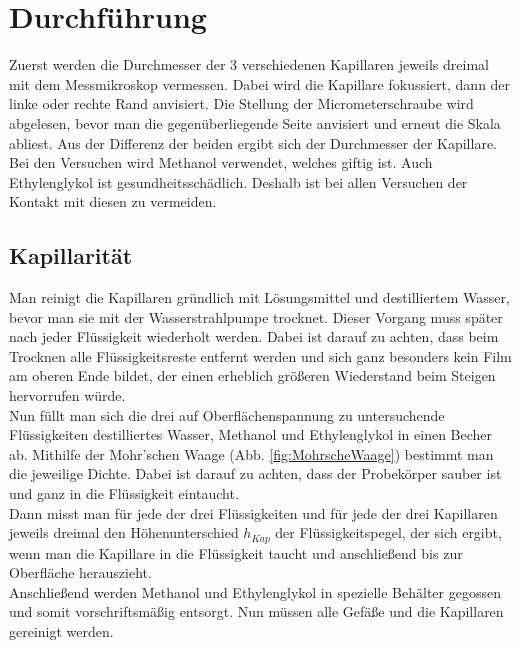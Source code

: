 \documentclass[12pt,a4paper,titlepage,headinclude,bibtotoc]{scrartcl}
\begin{document}
\section{Durchführung}
\label{sec:durchfuehrung}
Zuerst werden die Durchmesser der 3 verschiedenen Kapillaren jeweils dreimal mit dem Messmikroskop vermessen.
Dabei wird die Kapillare fokussiert, dann der linke oder rechte Rand anvisiert.
Die Stellung der Micrometerschraube wird abgelesen, bevor man die gegenüberliegende Seite anvisiert und erneut die Skala abliest.
Aus der Differenz der beiden ergibt sich der Durchmesser der Kapillare.\\
Bei den Versuchen wird Methanol verwendet, welches giftig ist.
Auch Ethylenglykol ist gesundheitsschädlich.
Deshalb ist bei allen Versuchen der Kontakt mit diesen zu vermeiden.

\subsection{Kapillarität}
Man reinigt die Kapillaren gründlich mit Lösungsmittel und destilliertem Wasser, bevor man sie mit der Wasserstrahlpumpe trocknet.
Dieser Vorgang muss später nach jeder Flüssigkeit wiederholt werden.
Dabei ist darauf zu achten, dass beim Trocknen alle Flüssigkeitsreste entfernt werden und sich ganz besonders kein Film am oberen Ende bildet, der einen erheblich größeren Wiederstand beim Steigen hervorrufen würde.\\
Nun füllt man sich die drei auf Oberflächenspannung zu untersuchende Flüssigkeiten destilliertes Wasser, Methanol und Ethylenglykol in einen Becher ab.
Mithilfe der Mohr'schen Waage (Abb. \ref{fig:MohrscheWaage}) bestimmt man die jeweilige Dichte.
Dabei ist darauf zu achten, dass der Probekörper sauber ist und ganz in die Flüssigkeit eintaucht.\\
Dann misst man für jede der drei Flüssigkeiten und für jede der drei Kapillaren jeweils dreimal den Höhenunterschied $h_{Kap}$ der Flüssigkeitspegel, der sich ergibt, wenn man die Kapillare in die Flüssigkeit taucht und anschließend bis zur Oberfläche herauszieht.\\
Anschließend werden Methanol und Ethylenglykol in spezielle Behälter gegossen und somit vorschriftsmäßig entsorgt.
Nun müssen alle Gefäße und die Kapillaren gereinigt werden.
\end{document}
